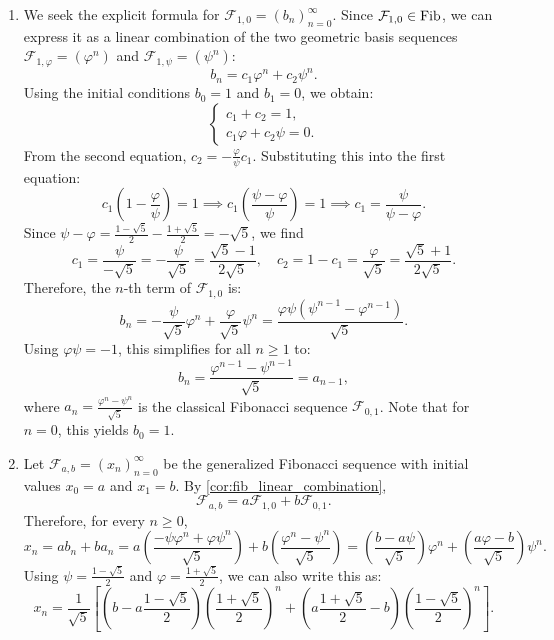\begin{exercisesolution*}
\label{sol:golden_ratio_part1}
\begin{enumerate}[label=\textbf{(\alph*)}]
    \item We seek the explicit formula for $\mathcal{F}_{1,0} = (b_n)_{n=0}^\infty$. Since $\mathcal{F}_{1,0} \in \operatorname{Fib}$, we can express it as a linear combination of the two geometric basis sequences $\mathcal{F}_{1,\varphi} = (\varphi^n)$ and $\mathcal{F}_{1,\psi} = (\psi^n)$:
    \[
    b_n = c_1 \varphi^n + c_2 \psi^n.
    \]
    Using the initial conditions $b_0 = 1$ and $b_1 = 0$, we obtain:
    \[
    \begin{cases}
    c_1 + c_2 = 1, \\
    c_1 \varphi + c_2 \psi = 0.
    \end{cases}
    \]
    From the second equation, $c_2 = -\frac{\varphi}{\psi} c_1$. Substituting this into the first equation:
    \[
    c_1 \left(1 - \frac{\varphi}{\psi}\right) = 1 \implies c_1 \left(\frac{\psi - \varphi}{\psi}\right) = 1 \implies c_1 = \frac{\psi}{\psi - \varphi}.
    \]
    Since $\psi - \varphi = \frac{1-\sqrt{5}}{2} - \frac{1+\sqrt{5}}{2} = -\sqrt{5}$, we find
    \[
    c_1 = \frac{\psi}{-\sqrt{5}} = -\frac{\psi}{\sqrt{5}} = \frac{\sqrt{5}-1}{2\sqrt{5}}, \quad c_2 = 1 - c_1 = \frac{\varphi}{\sqrt{5}} = \frac{\sqrt{5}+1}{2\sqrt{5}}.
    \]
    Therefore, the $n$-th term of $\mathcal{F}_{1,0}$ is:
    \[
    b_n = -\frac{\psi}{\sqrt{5}} \varphi^n + \frac{\varphi}{\sqrt{5}} \psi^n = \frac{\varphi \psi (\psi^{n-1} - \varphi^{n-1})}{\sqrt{5}}.
    \]
    Using $\varphi \psi = -1$, this simplifies for all $n \ge 1$ to:
    \[
    b_n = \frac{\varphi^{n-1} - \psi^{n-1}}{\sqrt{5}} = a_{n-1},
    \]
    where $a_n = \frac{\varphi^n - \psi^n}{\sqrt{5}}$ is the classical Fibonacci sequence $\mathcal{F}_{0,1}$. Note that for $n = 0$, this yields $b_0 = 1$.

    \item Let $\mathcal{F}_{a,b} = (x_n)_{n=0}^\infty$ be the generalized Fibonacci sequence with initial values $x_0 = a$ and $x_1 = b$. By \cref{cor:fib_linear_combination},
    \[
    \mathcal{F}_{a,b} = a \mathcal{F}_{1,0} + b \mathcal{F}_{0,1}.
    \]
    Therefore, for every $n \ge 0$,
    \[
    x_n = a b_n + b a_n = a \left(\frac{-\psi \varphi^n + \varphi \psi^n}{\sqrt{5}}\right) + b \left(\frac{\varphi^n - \psi^n}{\sqrt{5}}\right) = \left(\frac{b - a\psi}{\sqrt{5}}\right) \varphi^n + \left(\frac{a\varphi - b}{\sqrt{5}}\right) \psi^n.
    \]
    Using $\psi = \frac{1-\sqrt{5}}{2}$ and $\varphi = \frac{1+\sqrt{5}}{2}$, we can also write this as:
    \[
    x_n = \frac{1}{\sqrt{5}} \left[ \left(b - a \frac{1-\sqrt{5}}{2}\right) \left(\frac{1+\sqrt{5}}{2}\right)^n + \left(a \frac{1+\sqrt{5}}{2} - b\right) \left(\frac{1-\sqrt{5}}{2}\right)^n \right].
    \]
\end{enumerate}
\end{exercisesolution*}

